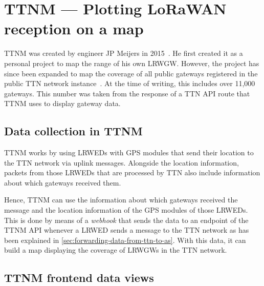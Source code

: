 \section{\acl{TTNM} — Plotting \acs{LoRaWAN} reception on a map}

\acf{TTNM} was created by engineer JP Meijers in 2015~\cite{linkedin_23_nodate}.
He first created it as a personal project to map the range of his own \acl{LRWGW}.
However, the project has since been expanded to map the coverage of all public gateways registered in the public \ac{TTN} network instance~\cite{the_things_network_jp_2018}.
At the time of writing, this includes over 11,000 gateways.
This number was taken from the response of a \ac{TTN} \ac{API} route that \ac{TTNM} uses to display gateway data.

\subsection{Data collection in \acl{TTNM}}\label{sec:ttm-data-collection}

\acl{TTNM} works by using \aclp{LRWED} with \ac{GPS} modules that send their location to the \ac{TTN} network via uplink messages.
Alongside the location information, packets from those \aclp{LRWED} that are processed by \ac{TTN} also include information about which gateways received them.

Hence, \acl{TTNM} can use the information about which gateways received the message and the location information of the \ac{GPS} modules of those \aclp{LRWED}.
This is done by means of a \emph{webhook} that sends the data to an endpoint of the \acl{TTNM} \ac{API} whenever a \acl{LRWED} sends a message to the \ac{TTN} network as has been explained in \cref{sec:forwarding-data-from-ttn-to-as}.
With this data, it can build a map displaying the coverage of \aclp{LRWGW} in the \ac{TTN} network.

\subsection{\acl{TTNM} frontend data views}

